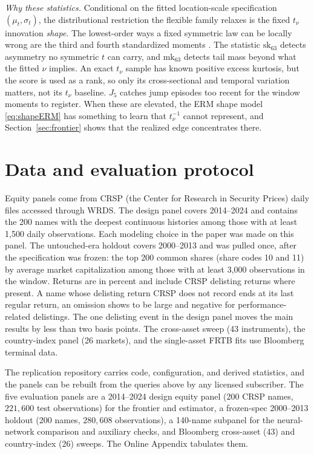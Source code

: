 \documentclass[11pt]{article}
\theoremstyle{remark}
\begin{document}
\emph{Why these statistics.} Conditional on the fitted location-scale
specification $(\mu_t,\sigma_t)$, the distributional restriction the
flexible family relaxes is the fixed $t_\nu$ innovation \emph{shape}.
The lowest-order ways a fixed symmetric law can be locally wrong are the third and fourth standardized moments \citep{bollerslev1987, hansen1994ARCD}. The statistic $\mathrm{sk}_{63}$ detects asymmetry no symmetric $t$ can carry, and $\mathrm{mk}_{63}$ detects tail mass beyond what the fitted $\nu$ implies. An exact $t_\nu$ sample has known positive excess kurtosis, but the score is used as a rank, so only its cross-sectional and temporal variation matters, not its $t_\nu$ baseline. $J_5$ catches
jump episodes too recent for the window moments to register. When these
are elevated, the ERM shape model \eqref{eq:shapeERM} has something to
learn that $t_\nu^{-1}$ cannot represent, and Section~\ref{sec:frontier} shows that the realized edge concentrates there.



\section{Data and evaluation protocol}\label{sec:protocol}

Equity panels come from CRSP (the Center for Research in Security Prices) daily files accessed through WRDS. The
design panel covers 2014--2024 and contains the 200 names with the
deepest continuous histories among those with at least 1{,}500 daily
observations. Each modeling choice in the paper was made on this
panel. The untouched-era holdout covers 2000--2013 and was pulled once,
after the specification was frozen: the top 200 common shares (share
codes 10 and 11) by average market capitalization among those with at
least 3{,}000 observations in the window. Returns are in percent and include
CRSP delisting returns where present. A name whose delisting return CRSP does not record ends at its last regular return, an omission \citet{shumway1997} shows to be large and negative for performance-related delistings. The one delisting event in the
design panel moves the main results by less than two basis points. The
cross-asset sweep (43 instruments), the country-index panel (26
markets), and the single-asset FRTB fits use Bloomberg terminal data.

The replication repository carries code, configuration, and derived
statistics, and the panels can be rebuilt from the queries above by any
licensed subscriber. The five evaluation panels are a 2014--2024 design equity panel (200 CRSP
names, $221{,}600$ test observations) for the frontier and estimator, a
frozen-spec 2000--2013 holdout (200 names, $280{,}608$ observations), a
140-name subpanel for the neural-network comparison and auxiliary checks, and Bloomberg cross-asset (43) and
country-index (26) sweeps. The Online Appendix tabulates them.
\end{document}
